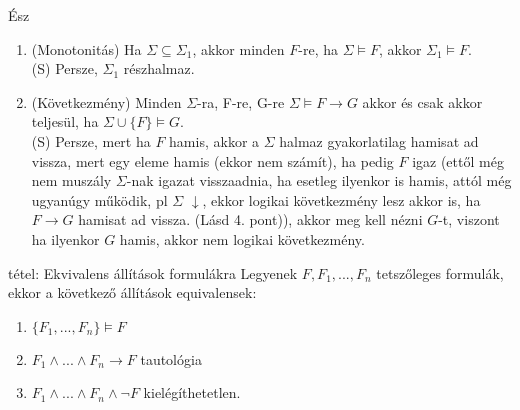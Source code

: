 \documentclass{beamer}
\begin{document}
\begin{frame}
\begin{block}{Ész}
\begin{enumerate}
{\tiny (S) 3. 5. 8. pontok összekombinálása eggyé.}\\
\item (Monotonitás) Ha $\Sigma \subseteq {\Sigma}_1$, akkor minden $F$-re, ha $\Sigma \models F$, akkor ${\Sigma}_1 \models F$.\\
{\tiny (S) Persze, ${\Sigma}_1$ részhalmaz.}\\
\item (Következmény) Minden $\Sigma$-ra, F-re, G-re $\Sigma \models F \rightarrow G$ akkor és csak akkor teljesül, ha $\Sigma \cup \{F\} \models G$.\\
{\tiny (S) Persze, mert ha $F$ hamis, akkor a $\Sigma$ halmaz gyakorlatilag hamisat ad vissza, mert egy eleme hamis (ekkor nem számít), ha pedig $F$ igaz (ettől még nem muszály $\Sigma$-nak igazat visszaadnia, ha esetleg ilyenkor is hamis, attól még ugyanúgy működik, pl $\Sigma$ $\downarrow$, ekkor logikai következmény lesz akkor is, ha $F \rightarrow G$ hamisat ad vissza. (Lásd 4. pont)), akkor meg kell nézni $G$-t, viszont ha ilyenkor $G$ hamis, akkor nem logikai következmény.}
\end{enumerate}
\end{block}

\end{frame}

\begin{frame}

\begin{block}{tétel: Ekvivalens állítások formulákra}
Legyenek $F, F_1, ... , F_n$ tetszőleges formulák, ekkor a következő állítások equivalensek:
\begin{enumerate}
\item $\{F_1, ... , F_n\} \models F$
\item $F_1 \land ... \land F_n \rightarrow F$ tautológia
\item $F_1 \land ... \land F_n \land \neg F$ kielégíthetetlen.
\end{enumerate}
\end{block}

\end{frame}
\end{document}
